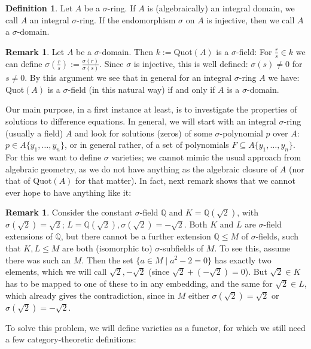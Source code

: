 \documentclass{article}
\def\Q{\mathbb{Q}}
\def\s{\sigma}
\theoremstyle{definition}
\newtheorem{rem}[Satz]{Remark}
\newtheorem{defn}[Satz]{Definition}
\begin{document}
\begin{defn}
Let $A$ be a $\s$-ring. If $A$ is (algebraically) an integral domain, we call $A$ an integral $\s$-ring. If the endomorphism $\s$ on $A$ is injective, then we call $A$ a $\s$-domain.
\end{defn}

\begin{rem}\label{sdomain=field}
Let $A$ be a $\s$-domain. Then $k:=$Quot$(A)$ is a $\s$-field: For $\frac{r}{s} \in k$ we can define $\s(\frac{r}{s}):= \frac{\s(r)}{\s(s)}$. Since $\s$ is injective, this is well defined: $\s(s) \neq 0$ for $s \neq 0$.
By this argument we see that in general for an integral $\s$-ring $A$ we have: Quot$(A)$ is a $\s$-field (in this natural way) if and only if $A$ is a $\s$-domain.
\end{rem}

Our main purpose, in a first instance at least, is to investigate the properties of solutions to difference equations. 
In general, we will start with an integral $\s$-ring (usually a field) $A$ %
and look for solutions (zeros) of some $\s$-polynomial $p$ over $A$: $p \in A\{y_1, \ldots, y_n \}$, or in general rather, of a set of polynomials $F \subseteq A\{y_1, \ldots, y_n \}$. 
For this we want to define $\s$ varieties; we cannot mimic the usual approach from algebraic geometry, as we do not have anything as the algebraic closure of $A$ (nor that of Quot$(A)$ for that matter). 
In fact, next remark shows that we cannot ever hope to have anything like it:

\begin{rem}\label{incompatibleextensions}
 Consider the constant $\s$-field $\Q$ and $K = \Q(\sqrt{2})$, with $\s (\sqrt{2}) = \sqrt{2}$; $L = \Q(\sqrt{2}), \s(\sqrt{2}) = - \sqrt{2}$. 
Both $K$ and $L$ are $\s$-field extensions of $\Q$, but there cannot be a further extension $\Q \leq M$ of $\s$-fields, such that $K,L \leq M$ are both (isomorphic to) $\s$-subfields of $M$. 
To see this, assume there was such an $M$. Then the set $\{ a \in M \mid a^2 - 2 = 0 \}$ has exactly two elements, which we will call $\sqrt{2}, -\sqrt{2}$ (since $\sqrt{2} + (- \sqrt{2}) = 0$).
But $\sqrt{2} \in K$ has to be mapped to one of these to in any embedding, and the same for $\sqrt{2} \in L$, which already gives the contradiction,
 since in $M$ either $\s(\sqrt{2}) = \sqrt{2}$ or $\s(\sqrt{2}) = -\sqrt{2}$.
\end{rem}

To solve this problem, we will define varieties as a functor, for which we still need a few category-theoretic definitions:
\end{document}

